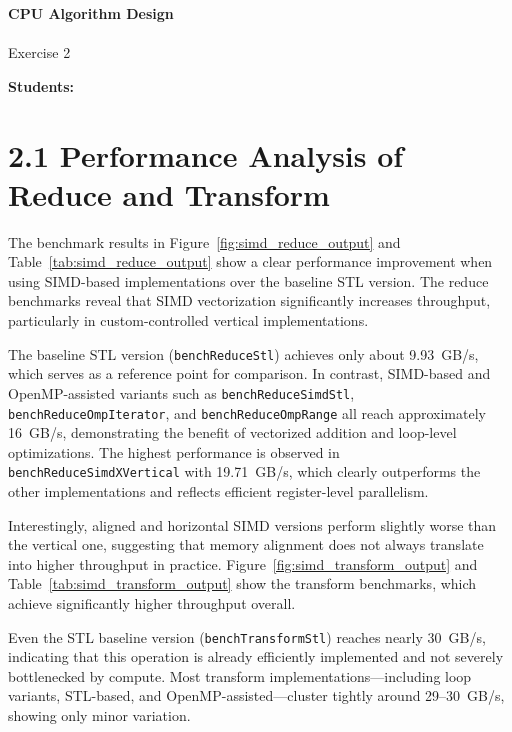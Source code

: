 





\begin{Large}
    \textsf{\textbf{CPU Algorithm Design}} \\
    \\
    Exercise 2
\end{Large}
\vspace{1ex}
\textsf{\textbf{Students:}}  \\
\vspace{2ex}

\section*{2.1 Performance Analysis of Reduce and Transform}

The benchmark results in Figure~\ref{fig:simd_reduce_output} and Table~\ref{tab:simd_reduce_output} show a clear performance improvement when using SIMD-based implementations over the baseline STL version.
The reduce benchmarks reveal that SIMD vectorization significantly increases throughput, particularly in custom-controlled vertical implementations.

The baseline STL version (\texttt{benchReduceStl}) achieves only about 9.93~GB/s, which serves as a reference point for comparison.
In contrast, SIMD-based and OpenMP-assisted variants such as \texttt{benchReduceSimdStl}, \texttt{benchReduceOmpIterator}, and \texttt{benchReduceOmpRange} all reach approximately 16~GB/s, demonstrating the benefit of vectorized addition and loop-level optimizations.
The highest performance is observed in \texttt{benchReduceSimdXVertical} with 19.71~GB/s, which clearly outperforms the other implementations and reflects efficient register-level parallelism.

Interestingly, aligned and horizontal SIMD versions perform slightly worse than the vertical one, suggesting that memory alignment does not always translate into higher throughput in practice.
Figure~\ref{fig:simd_transform_output} and Table~\ref{tab:simd_transform_output} show the transform benchmarks, which achieve significantly higher throughput overall.

Even the STL baseline version (\texttt{benchTransformStl}) reaches nearly 30~GB/s, indicating that this operation is already efficiently implemented and not severely bottlenecked by compute.
Most transform implementations—including loop variants, STL-based, and OpenMP-assisted—cluster tightly around 29--30~GB/s, showing only minor variation.

